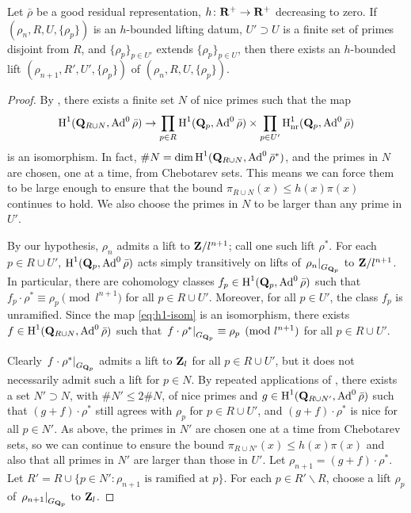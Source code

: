 \begin{theorem}\label{thm:lifting-datum}
Let $\bar\rho$ be a good residual representation, $h\colon \mathbf{R}^+ \to \mathbf{R}^+$ 
decreasing to zero. If $(\rho_n,R,U,\{\rho_p\})$ is an $h$-bounded lifting 
datum, $U'\supset U$ is a finite set of primes disjoint from $R$, and 
$\{\rho_p\}_{p\in U'}$ extends $\{\rho_p\}_{p\in U}$, then there exists an 
$h$-bounded lift $(\rho_{n+1},R',U',\{\rho_p\})$ of 
$(\rho_n,R,U,\{\rho_p\})$. 
\end{theorem}
\begin{proof}
By \cite[Lem.~8]{khare-larsen-ramakrishna-2005}, there exists a finite set 
$N$ of nice primes such that the map 
\begin{equation}\label{eq:h1-isom}
	\operatorname{H}^1(\mathbf{Q}_{R\cup N},\operatorname{Ad}^0\bar\rho) \to \prod_{p\in R} \operatorname{H}^1(\mathbf{Q}_p,\operatorname{Ad}^0\bar\rho) \times \prod_{p\in U'} \operatorname{H}_{\mathrm{nr}}^1(\mathbf{Q}_p,\operatorname{Ad}^0\bar\rho) 
\end{equation}
is an isomorphism. In fact, 
$\# N = \dim\operatorname{H}^1(\mathbf{Q}_{R\cup N},\operatorname{Ad}^0\bar\rho^\ast)$, and the primes in $N$ are 
chosen, one at a time, from Chebotarev sets. This means we can force them to 
be large enough to ensure that the bound 
$\pi_{R\cup N}(x) \leqslant h(x) \pi(x)$ continues to hold. We also choose the 
primes in $N$ to be larger than any prime in $U'$. 

By our hypothesis, $\rho_n$ admits a lift to $\mathbf{Z}/l^{n+1}$; call one such lift 
$\rho^\ast$. For each $p\in R\cup U'$, $\operatorname{H}^1(\mathbf{Q}_p,\operatorname{Ad}^0\bar\rho)$ acts simply 
transitively on lifts of $\left.\rho_n\right|_{G_{\mathbf{Q}_p}}$ to $\mathbf{Z}/l^{n+1}$. In 
particular, there are cohomology classes $f_p\in \operatorname{H}^1(\mathbf{Q}_p,\operatorname{Ad}^0\bar\rho)$ 
such that $f_p\cdot \rho^\ast \equiv \rho_p\pmod{l^{n+1}}$ for all 
$p\in R\cup U'$. Moreover, for all $p\in U'$, the class $f_p$ is unramified. 
Since the map \eqref{eq:h1-isom} is an isomorphism, there exists 
$f\in \operatorname{H}^1(\mathbf{Q}_{R\cup N},\operatorname{Ad}^0\bar\rho)$ such that 
$\left.f\cdot \rho^\ast\right|_{G_{\mathbf{Q}_p}}\equiv \rho_p\pmod{l^{n+1}}$ for all 
$p\in R\cup U'$. 

Clearly $\left. f\cdot \rho^\ast\right|_{G_{\mathbf{Q}_p}}$ admits a lift to $\mathbf{Z}_l$ 
for all $p\in R\cup U'$, but it does not necessarily admit such a lift for 
$p\in N$. By repeated applications of \cite[Prop.~3.10]{pande-2011}, there 
exists a set $N'\supset N$, with $\# N'\leqslant 2\# N$, of nice primes and 
$g\in \operatorname{H}^1(\mathbf{Q}_{R\cup N'},\operatorname{Ad}^0\bar\rho)$ such that 
$(g+f)\cdot \rho^\ast$ still agrees with $\rho_p$ for $p\in R\cup U'$, and 
$(g+f)\cdot \rho^\ast$ is nice for all $p\in N'$. As above, the primes in $N'$ 
are chosen one at a time from Chebotarev sets, so we can continue to ensure the 
bound $\pi_{R\cup N'}(x)\leqslant h(x) \pi(x)$ and also that all primes in $N'$ 
are larger than those in $U'$. Let $\rho_{n+1} = (g+f) \cdot \rho^\ast$. Let 
$R' = R\cup \{p\in N' : \rho_{n+1}\text{ is ramified at }p\}$. For each 
$p\in R'\smallsetminus R$, choose a lift $\rho_p$ of 
$\left. \rho_{n+1}\right|_{G_{\mathbf{Q}_p}}$ to $\mathbf{Z}_l$. 


\end{proof}
